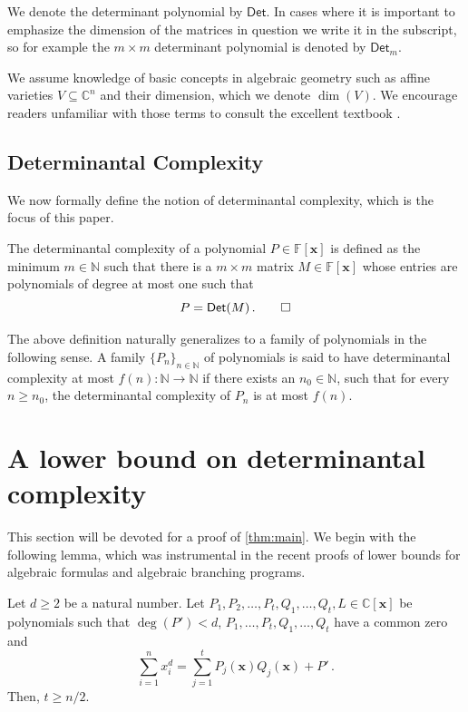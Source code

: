 \documentclass[10pt,a4paper]{article}
\newcommand{\F}{\mathbb{F}}
\newcommand{\N}{\mathbb{N}}
\newcommand{\CC}{\mathbb{C}}
\newcommand{\vx}{\mathbf{x}}
\newcommand{\Det}{\mathsf{Det}}
\begin{document}
We denote the determinant polynomial by $\Det$. In cases where it is important to emphasize the dimension of the matrices in question we write it in the subscript, so for example the $m \times m$ determinant polynomial is denoted by $\Det_m$.

We assume knowledge of basic concepts in algebraic geometry such as affine varieties $V \subseteq \CC^n$ and their dimension, which we denote $\dim(V)$. We encourage readers unfamiliar with those terms to consult the excellent textbook \cite{CLO07}. 

\subsection*{Determinantal Complexity}
We now formally define the notion of determinantal complexity, which is the focus of this paper. 
\begin{definition}
The determinantal complexity of a polynomial $P \in \F[\vx]$ is defined as the minimum $m \in \N$ such that there is a $m \times m$ matrix $M \in \F[\vx]$ whose entries are polynomials of degree at most one such that 
\[
P = \Det(M) \, . \qedhere
\]
\end{definition}
\begin{remark}
The above definition naturally generalizes to a family of polynomials in the following sense. A family  $\{P_n\}_{n\in \N}$ of polynomials is said to have determinantal complexity at most $f(n): \N \to \N$ if there exists an $n_0 \in \N$, such that for every $n \geq n_0$, the determinantal complexity of $P_n$ is at most $f(n)$. 
\end{remark}


\section{A lower bound on determinantal complexity}\label{sec:main-lb}

This section will be devoted for a proof of \autoref{thm:main}. We begin with the following lemma, which was instrumental in the recent proofs of lower bounds for algebraic formulas and algebraic branching programs.

\begin{lemma}\label{lemma: width lb}
Let $d \ge 2$ be a natural number. Let $P_1, P_2, \ldots, P_t, Q_1, \ldots, Q_t, \allowbreak L \in \CC[\vx]$ be polynomials such that $\deg(P') < d$, $P_1, \ldots, P_t, Q_1, \ldots, Q_t$ have a common zero and 
\[
\sum_{i = 1}^n x_i^d = \sum_{j = 1}^t P_j(\vx)Q_j(\vx) + P' \, .
\]
Then, $t \geq n/2$. 
\end{lemma}
\end{document}

